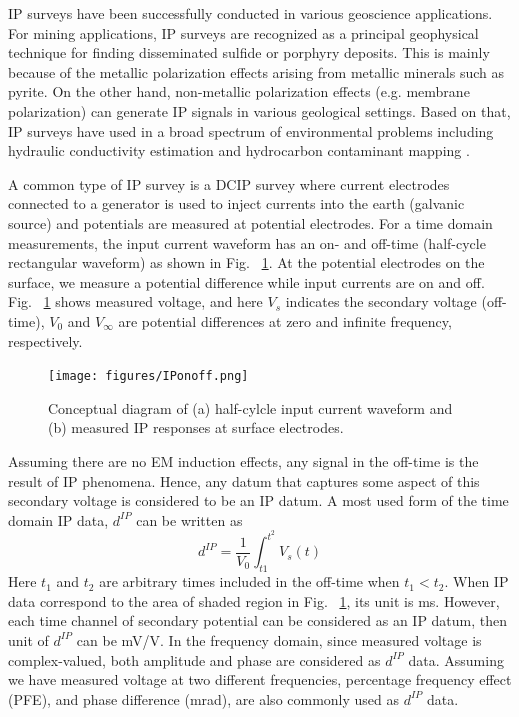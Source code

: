 \documentclass[letterpaper,11pt]{article}
\newcommand{\dip}{d^{IP}}
\begin{document}
IP surveys have been successfully conducted in various geoscience applications. For mining applications, IP surveys are recognized as a principal geophysical technique for finding disseminated sulfide or porphyry deposits. This is mainly because of the metallic polarization effects arising from metallic minerals such as pyrite. On the other hand, non-metallic polarization effects (e.g. membrane polarization) can generate IP signals in various geological settings. Based on that, IP surveys have used  in a broad spectrum of environmental problems including hydraulic conductivity estimation and hydrocarbon contaminant mapping \cite[]{Kemna2012}. 

A common type of IP survey is a DCIP survey where current electrodes connected to a generator is used to inject currents into the earth (galvanic source) and potentials are measured at potential electrodes. For a time domain measurements, the input current waveform has an  on- and off-time (half-cycle rectangular waveform) as shown in Fig. ~\ref{Fig:IPonoff}. At the  potential electrodes on the surface, we measure a potential difference while input currents are on and off. Fig. ~\ref{Fig:IPonoff} shows measured voltage, and here $V_s$ indicates the secondary voltage (off-time), $V_0$ and $V_{\infty}$ are potential differences at zero and infinite frequency, respectively. 
\begin{figure}[htb]
  \centering
  \texttt{[image: figures/IPonoff.png]}
  \caption{Conceptual diagram of (a) half-cylcle input current waveform and (b) measured IP responses at surface electrodes.}
  \label{Fig:IPonoff}
\end{figure}
Assuming there are no EM induction effects, any signal in the off-time is the result of IP phenomena. Hence, any datum that captures some aspect of this secondary voltage is considered to be an IP datum. A most used form of the time domain IP data, $\dip$ can be written as  
\begin{equation}
  \dip = \frac{1}{V_0}\int_{t1}^{t^2} V_s(t)
\end{equation}
Here $t_1$ and $t_2$ are arbitrary times included in the off-time when $t_1 < t_2$. When IP data correspond to the area of shaded region in Fig. ~\ref{Fig:IPonoff},  its unit is ms. However, each time channel of secondary potential can be considered as an IP datum, then unit of $\dip$ can be mV/V. In the frequency domain, since measured voltage is complex-valued, both amplitude and phase are considered as $\dip$ data. Assuming we have measured voltage at two different frequencies, percentage frequency effect (PFE), and phase difference (mrad), are also commonly used as $\dip$ data.  
\end{document}
